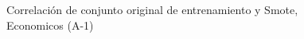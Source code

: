 \begin{figure}[H]
    \centering
    
    \caption{Correlación de conjunto original de entrenamiento y Smote, Economicos (A-1)}
    \label{pairwise-economicos-a-1-smote-enc}
\end{figure}
